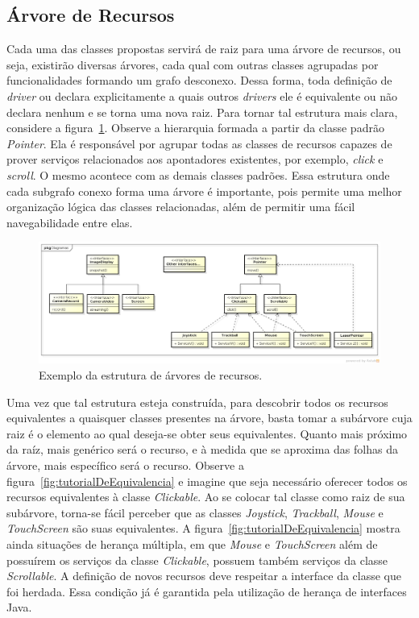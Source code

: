 \subsection{Árvore de Recursos}

Cada uma das classes propostas servirá de raiz para uma árvore de recursos, ou seja, existirão diversas árvores, cada qual com outras classes agrupadas por funcionalidades formando um grafo desconexo. Dessa forma, toda definição de \emph{driver} ou declara explicitamente a quais outros \emph{drivers} ele é equivalente ou não declara nenhum e se torna uma nova raiz. Para tornar tal estrutura mais clara, considere a figura~\ref{fig:arvoreDeRecursos}. Observe a hierarquia formada a partir da classe padrão \emph{Pointer}. Ela é responsável por agrupar todas as classes de recursos capazes de prover serviços relacionados aos apontadores existentes, por exemplo, \emph{click} e \emph{scroll}. O mesmo acontece com as demais classes padrões. Essa estrutura onde cada subgrafo conexo forma uma árvore é importante, pois permite uma melhor organização lógica das classes relacionadas, além de permitir uma fácil navegabilidade entre elas.

\begin{figure}[ht]
	\center
	\includegraphics[scale=0.35]{imagens/hierarquiaDeRecursos}
	\caption{Exemplo da estrutura de árvores de recursos.}
	\label{fig:arvoreDeRecursos}
\end{figure}

Uma vez que tal estrutura esteja construída, para descobrir todos os recursos equivalentes a quaisquer classes presentes na árvore, basta tomar a subárvore cuja raiz é o elemento ao qual deseja-se obter seus equivalentes. Quanto mais próximo da raíz, mais genérico será o recurso, e à medida que se aproxima das folhas da árvore, mais específico será o recurso. Observe a figura~\ref{fig:tutorialDeEquivalencia} e imagine que seja necessário oferecer todos os recursos equivalentes à classe \emph{Clickable}. Ao se colocar tal classe como raiz de sua subárvore, torna-se fácil perceber que as classes \emph{Joystick}, \emph{Trackball}, \emph{Mouse} e \emph{TouchScreen} são suas equivalentes. A figura~\ref{fig:tutorialDeEquivalencia} mostra ainda situações de herança múltipla, em que \emph{Mouse} e \emph{TouchScreen} além de possuírem os serviços da classe \emph{Clickable}, possuem também serviços da classe \emph{Scrollable}. A definição de novos recursos deve respeitar a interface da classe que foi herdada. Essa condição já é garantida pela utilização de herança de interfaces Java.

